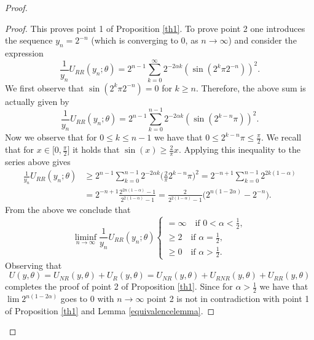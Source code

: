 \documentclass[12pt,a4paper]{article}
\theoremstyle{definition}
\theoremstyle{remark}
\numberwithin{equation}{section}
\begin{document}
\begin{proof}
\begin{proof}
This proves point 1 of Proposition \ref{th1}. To prove point 2 one introduces the sequence $y_n=2^{-n}$ (which is converging to 0, as $n \rightarrow \infty$)  and consider the expression
\begin{equation}
\frac{1}{ y_n } U_{RR} (y_n;\theta)=2^{n-1}   \sum_{k =0}^{\infty} 2^{-2\alpha k} (\sin(2^{k } \pi 2^{-n}))^2.
\end{equation}
We first observe that $\sin(2^{k } \pi 2^{-n}) = 0$ for $k \geq n$. Therefore, the above sum is actually given by
\begin{equation}
\frac{1}{ y_n } U_{RR} (y_n;\theta)=2^{n-1}   \sum_{k =0}^{n-1} 2^{-2\alpha k} (\sin(2^{k -n} \pi ))^2.
\end{equation}
Now we observe that for $0 \leq k \leq n-1$ we have that $0 \leq 2^{k -n} \pi \leq \frac{\pi}{2}$. We recall that for $x \in \big[ 0, \frac{\pi}{2} \big]$ it holds that $\sin (x) \geq \frac{2}{\pi } x$. Applying this inequality to the series above gives
\begin{align*}
\frac{1}{ y_n } U_{RR} (y_n;\theta) &\geq 2^{n-1} \sum_{k =0}^{n-1} 2^{-2\alpha k} \bigg( \frac{2}{\pi} 2^{k -n} \pi \bigg)^2 = 2^{-n+1} \sum_{k =0}^{n-1} 2^{2k (1 - \alpha)} \\
&= 2^{-n+1} \frac{2^{2n(1-\alpha)} - 1}{2^{2(1-\alpha)} -1} = \frac{2}{2^{2(1-\alpha)} -1} \big( 2^{n(1-2\alpha)} - 2^{-n} \big).
\end{align*}
From the above we conclude that
\begin{equation}
\liminf_{n \rightarrow \infty} \frac{1}{ y_n } U_{RR} (y_n;\theta) \begin{cases}
= \infty \quad \text{if } 0 < \alpha < \frac{1}{2}, \\
\geq 2 \quad \text{if } \alpha = \frac{1}{2}, \\
\geq 0 \quad \text{if } \alpha > \frac{1}{2}.
\end{cases}
\end{equation}
Observing that 
\begin{equation*}
U(y,\theta) = U_{NR}(y,\theta) +  U_{R}(y,\theta) =  U_{NR}(y,\theta) + U_{RNR}(y,\theta) + U_{RR}(y,\theta)
\end{equation*}
completes the proof of point 2 of Proposition \ref{th1}. Since for $\alpha >\frac 12$ we have that $\lim 2^{n(1-2\alpha)}$ goes to $0$ with $n\rightarrow \infty$ point 2 is not in contradiction with point 1 of Proposition \ref{th1} and Lemma \ref{equivalencelemma}.
\end{proof}

\end{proof}
\end{document}
